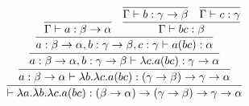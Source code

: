 \begin{equation*}
\infer{\vdash \lambda a. \lambda b. \lambda c. a (b c) : (\beta \rightarrow \alpha) \rightarrow (\gamma \rightarrow \beta) \rightarrow \gamma \rightarrow \alpha}{
%
\infer{a : \beta \rightarrow \alpha \vdash \lambda b. \lambda c. a (b c) : (\gamma \rightarrow \beta) \rightarrow \gamma \rightarrow \alpha}{
%
\infer{a : \beta \rightarrow \alpha, b : \gamma \rightarrow \beta \vdash \lambda c. a (b c) : \gamma \rightarrow \alpha}{
%
\infer{a : \beta \rightarrow \alpha, b : \gamma \rightarrow \beta, c : \gamma \vdash a (b c) : \alpha}{
%
\infer{\Gamma \vdash a : \beta \rightarrow \alpha}{}
&
\infer{\Gamma \vdash b c : \beta}{
%
\infer{\Gamma \vdash b : \gamma \rightarrow \beta}{}
&
\infer{\Gamma \vdash c : \gamma}{}
}
}
}
}
}
\end{equation*}